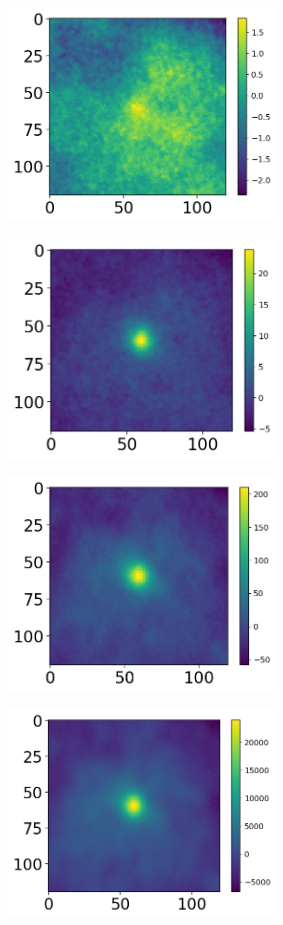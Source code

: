 \documentclass{princeton_astro_thesis}
\begin{document}
\begin{figure}[ht]
\begin{subfigure}[b]{0.5\linewidth}
    \centering\includegraphics[width=200pt]{../f217_redmapper_wstack.png}
    \caption{\label{fig:fig3}}
  \end{subfigure}
 \begin{subfigure}[b]{0.1\linewidth}
    \centering\includegraphics[width=200pt]{../f353_redmapper_wstack.png}
    \caption{\label{fig:fig3}}
  \end{subfigure}
  \newline
 \begin{subfigure}[b]{0.5\linewidth}
    \centering\includegraphics[width=200pt]{../f545_redmapper_wstack.png}
    \caption{\label{fig:fig3}}
  \end{subfigure}
   \begin{subfigure}[b]{0.1\linewidth}
    \centering\includegraphics[width=200pt]{../f857_redmapper_wstack.png}

\end{subfigure}
\end{figure}
\end{document}
